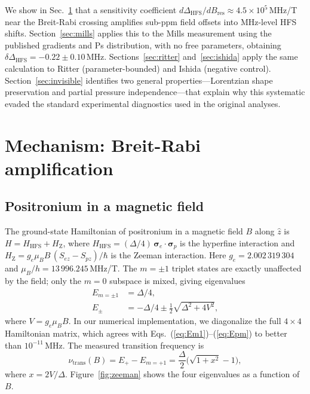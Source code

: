 \documentclass[twocolumn,pra,aps,superscriptaddress,floatfix,10pt]{revtex4-2}
\begin{document}
We show in Sec.~\ref{sec:mechanism} that a sensitivity coefficient $d\Delta_\mathrm{HFS}/dB_\mathrm{res} \approx 4.5 \times 10^5$\,MHz/T near the Breit-Rabi crossing amplifies sub-ppm field offsets into MHz-level HFS shifts. Section~\ref{sec:mills} applies this to the Mills measurement using the published gradients and Ps distribution, with no free parameters, obtaining $\delta\Delta_\mathrm{HFS} = -0.22 \pm 0.10$\,MHz. Sections~\ref{sec:ritter} and~\ref{sec:ishida} apply the same calculation to Ritter (parameter-bounded) and Ishida (negative control). Section~\ref{sec:invisible} identifies two general properties---Lorentzian shape preservation and partial pressure independence---that explain why this systematic evaded the standard experimental diagnostics used in the original analyses.

\section{Mechanism: Breit-Rabi amplification}
\label{sec:mechanism}

\subsection{Positronium in a magnetic field}

The ground-state Hamiltonian of positronium in a magnetic field $B$ along $\hat{z}$ is $H = H_\mathrm{HFS} + H_\mathrm{Z}$, where $H_\mathrm{HFS} = (\Delta/4)\,\bm{\sigma}_e \cdot \bm{\sigma}_p$ is the hyperfine interaction and $H_\mathrm{Z} = g_e \mu_B B\,(S_{ez} - S_{pz})/\hbar$ is the Zeeman interaction. Here $g_e = 2.002\,319\,304$ and $\mu_B/h = 13\,996.245$\,MHz/T. The $m = \pm 1$ triplet states are exactly unaffected by the field; only the $m = 0$ subspace is mixed, giving eigenvalues
\begin{align}
  E_{m=\pm 1} &= \Delta/4, \label{eq:Em1} \\
  E_{\pm} &= -\Delta/4 \pm \tfrac{1}{2}\sqrt{\Delta^2 + 4V^2}, \label{eq:Epm}
\end{align}
where $V = g_e \mu_B B$. In our numerical implementation, we diagonalize the full $4 \times 4$ Hamiltonian matrix, which agrees with Eqs.~(\ref{eq:Em1})--(\ref{eq:Epm}) to better than $10^{-11}$\,MHz. The measured transition frequency is
\begin{equation}
  \nu_\mathrm{trans}(B) = E_+ - E_{m=+1} = \frac{\Delta}{2}\bigl(\sqrt{1 + x^2} - 1\bigr),
  \label{eq:nutrans}
\end{equation}
where $x = 2V/\Delta$. Figure~\ref{fig:zeeman} shows the four eigenvalues as a function of $B$.
\end{document}
